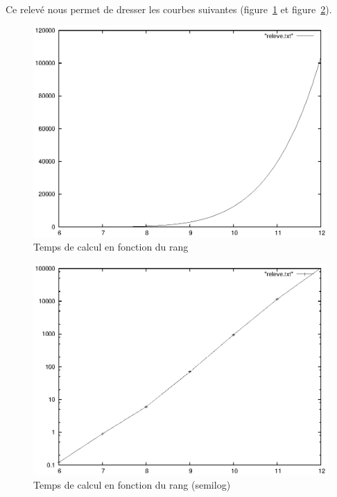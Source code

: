 \documentclass[10pt]{article}%
\begin{document}
\paragraph*{}
Ce relevé nous permet de dresser les courbes suivantes (figure~\ref{fig:temps_normal}
et figure~\ref{fig:temps_semilog}).
\begin{figure}[h]
\centering
\includegraphics{fig/temps_normal.eps}
\caption{Temps de calcul en fonction du rang}
\label{fig:temps_normal}
\end{figure}
\begin{figure}[h]
\centering
\includegraphics{fig/temps_semilog.eps}
\caption{Temps de calcul en fonction du rang (semilog)}
\label{fig:temps_semilog}
\end{figure}
\end{document}
